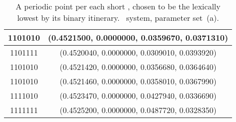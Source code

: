 \begin{table}
\begin{tabular}{c|c}
 	\hline
	1101010  & (0.4521500, 0.0000000, 0.0359670, 0.0371310) \\
 	\hline
	1101111  & (0.4520040, 0.0000000, 0.0309010, 0.0393920) \\
 	\hline
	1101010  & (0.4521420, 0.0000000, 0.0356680, 0.0364640) \\
 	\hline
	1101010  & (0.4521460, 0.0000000, 0.0358010, 0.0367990) \\
 	\hline
	1111010  & (0.4523470, 0.0000000, 0.0427940, 0.0336690) \\
 	\hline
	1111111  & (0.4525200, 0.0000000, 0.0487720, 0.0328350) \\
 	\end{tabular}
	\caption{A periodic point per each
            short \rpo, chosen to be the lexically lowest by its binary itinerary.
             \twoMode\ system, parameter set \,(a).}
	\label{tab:symbdyn}
\end{table}
